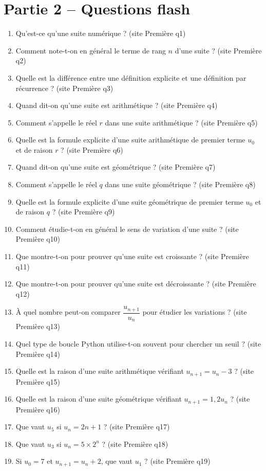 \documentclass[11pt,a4paper]{article}
\newcommand{\sourceq}[1]{ {\scriptsize\textcolor{bleufonce}{(site Première q#1)}}}
\newcounter{question}
\newenvironment{blocquestions}[1]{%
  \begin{tcolorbox}[enhanced,breakable,colback=bleuclair,colframe=bleufonce,boxrule=0.6pt,arc=2mm,left=2mm,right=2mm,top=2mm,bottom=1.5mm,title={\bfseries #1},coltitle=white,colbacktitle=bleufonce,before skip=3mm,after skip=3mm, fontupper=\large]
  \large
  \begin{enumerate}[leftmargin=*,label=\textbf{\arabic*.},itemsep=0.82em,topsep=0.5em]
  \setcounter{enumi}{\value{question}}
}{%
  \setcounter{question}{\value{enumi}}
  \end{enumerate}
  \end{tcolorbox}
}
\begin{document}
\section*{Partie 2 -- Questions flash}
\begin{blocquestions}{Questions flash -- Suites}
  \item Qu'est-ce qu'une suite numérique ? \sourceq{1}
  \item Comment note-t-on en général le terme de rang $n$ d'une suite ? \sourceq{2}
  \item Quelle est la différence entre une définition explicite et une définition par récurrence ? \sourceq{3}
  \item Quand dit-on qu'une suite est arithmétique ? \sourceq{4}
  \item Comment s'appelle le réel $r$ dans une suite arithmétique ? \sourceq{5}
  \item Quelle est la formule explicite d'une suite arithmétique de premier terme $u_0$ et de raison $r$ ? \sourceq{6}
  \item Quand dit-on qu'une suite est géométrique ? \sourceq{7}
  \item Comment s'appelle le réel $q$ dans une suite géométrique ? \sourceq{8}
  \item Quelle est la formule explicite d'une suite géométrique de premier terme $u_0$ et de raison $q$ ? \sourceq{9}
  \item Comment étudie-t-on en général le sens de variation d'une suite ? \sourceq{10}
  \item Que montre-t-on pour prouver qu'une suite est croissante ? \sourceq{11}
  \item Que montre-t-on pour prouver qu'une suite est décroissante ? \sourceq{12}
  \item À quel nombre peut-on comparer $\dfrac{u_{n+1}}{u_n}$ pour étudier les variations ? \sourceq{13}
  \item Quel type de boucle Python utilise-t-on souvent pour chercher un seuil ? \sourceq{14}
  \item Quelle est la raison d'une suite arithmétique vérifiant $u_{n+1}=u_n-3$ ? \sourceq{15}
  \item Quelle est la raison d'une suite géométrique vérifiant $u_{n+1}=1{,}2u_n$ ? \sourceq{16}
  \item Que vaut $u_5$ si $u_n=2n+1$ ? \sourceq{17}
  \item Que vaut $u_3$ si $u_n=5\times2^n$ ? \sourceq{18}
  \item Si $u_0=7$ et $u_{n+1}=u_n+2$, que vaut $u_1$ ? \sourceq{19}

\end{blocquestions}
\end{document}
